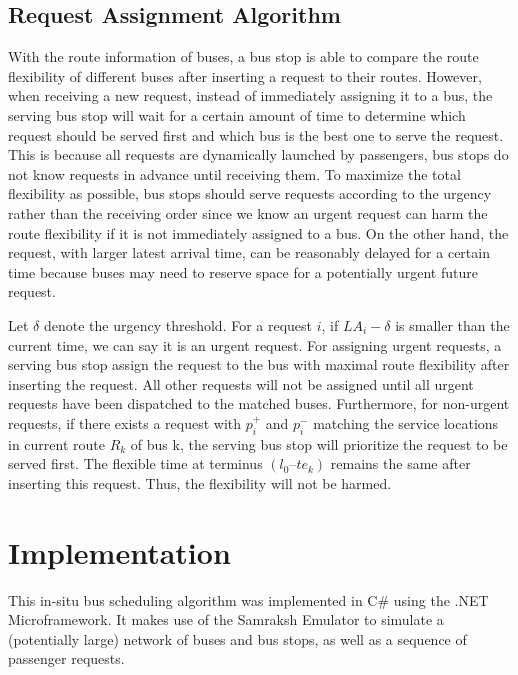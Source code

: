 \documentclass[runningheads]{llncs}
\begin{document}
\subsection{Request Assignment Algorithm}
With the route information of buses, a bus stop is able to compare the route flexibility of different buses after inserting a request to their routes. However, when receiving a new request, instead of immediately assigning it to a bus, the serving bus stop will wait for a certain amount of time to determine which request should be served first and which bus is the best one to serve the request. This is because all requests are dynamically launched by passengers, bus stops do not know requests in advance until receiving them. To maximize the total flexibility as possible, bus stops should serve requests according to the urgency rather than the receiving order since we know an urgent request can harm the route flexibility if it is not immediately assigned to a bus. On the other hand, the request, with larger latest arrival time, can be reasonably delayed for a certain time because buses may need to reserve space for a potentially urgent future request.

Let $\delta$ denote the urgency threshold. For a request $i$, if $LA_i - \delta$ is smaller than the current time, we can say it is an urgent request. For assigning urgent requests, a serving bus stop assign the request to the bus with maximal route flexibility after inserting the request. All other requests will not be assigned until all urgent requests have been dispatched to the matched buses. Furthermore, for non-urgent requests, if there exists a request with $p_i^+$ and $p_i^-$ matching the service locations in current route $R_k$ of bus k, the serving bus stop will prioritize the request to be served first. The flexible time at terminus $(l_0 – te_k)$ remains the same after inserting this request. Thus, the flexibility will not be harmed.

\section{Implementation}
This in-situ bus scheduling algorithm was implemented in C\# using the .NET Microframework. It makes use of the Samraksh Emulator to simulate a (potentially large) network of buses and bus stops, as well as a sequence of passenger requests.
\end{document}

